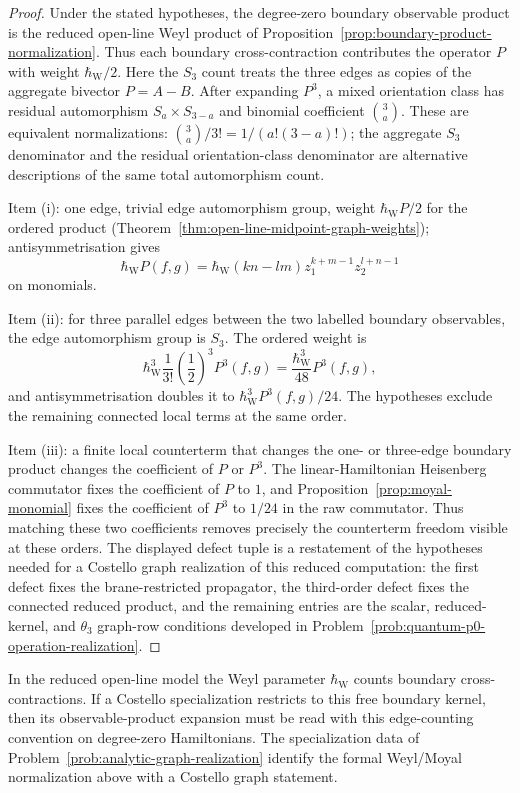 \documentclass[11pt]{memoir}
\begin{document}
\begin{proof}
  Under the stated hypotheses, the degree-zero boundary observable product is
  the reduced open-line Weyl product of
  Proposition~\ref{prop:boundary-product-normalization}. Thus each
	  boundary cross-contraction contributes the operator $P$ with weight
	  \(\hbar_{\mathrm{W}}/2\).
  Here the \(S_3\) count treats the three edges as copies of the aggregate
  bivector \(P=A-B\).  After expanding \(P^3\), a mixed orientation class
  has residual automorphism \(S_a\times S_{3-a}\) and binomial coefficient
  \(\binom{3}{a}\). These are equivalent normalizations:
  \(\binom{3}{a}/3!=1/(a!(3-a)!)\); the aggregate \(S_3\) denominator
  and the residual orientation-class denominator are alternative
  descriptions of the same total automorphism count.

	  Item (i): one edge, trivial edge automorphism group, weight \(\hbar_{\mathrm{W}} P/2\) for the
  ordered product (Theorem~\ref{thm:open-line-midpoint-graph-weights});
  antisymmetrisation gives
	  $$\hbar_{\mathrm{W}} P(f,g)=\hbar_{\mathrm{W}}(kn-lm)z_1^{k+m-1}z_2^{l+n-1}$$
  on monomials.

  Item (ii): for three parallel edges between the two labelled boundary
  observables, the edge automorphism group is $S_3$. The ordered weight is
	  $$\hbar_{\mathrm{W}}^3\frac1{3!}\left(\frac12\right)^3P^3(f,g)
	    =\frac{\hbar_{\mathrm{W}}^3}{48}P^3(f,g),$$
	  and antisymmetrisation doubles it to \(\hbar_{\mathrm{W}}^3P^3(f,g)/24\). The hypotheses
  exclude the remaining connected local terms at the same order.

  Item (iii): a finite local counterterm that changes the one- or three-edge
  boundary product changes the coefficient of $P$ or $P^3$. The
  linear-Hamiltonian Heisenberg commutator fixes the coefficient of $P$ to
  $1$, and Proposition~\ref{prop:moyal-monomial} fixes the coefficient of
  $P^3$ to $1/24$ in the raw commutator. Thus matching these two coefficients
  removes precisely the counterterm freedom visible at these orders.  The
  displayed defect tuple is a restatement of the hypotheses needed for a
  Costello graph realization of this reduced computation: the first defect fixes
  the brane-restricted propagator, the third-order defect fixes the
  connected reduced product, and the remaining entries are the scalar,
  reduced-kernel, and \(\theta_3\) graph-row conditions developed in
  Problem~\ref{prob:quantum-p0-operation-realization}.
\end{proof}

\begin{rmk}
	  In the reduced open-line model the Weyl parameter \(\hbar_{\mathrm{W}}\) counts boundary
  cross-contractions. If a Costello specialization restricts to this free
  boundary kernel, then its observable-product expansion must be read with this
  edge-counting convention on degree-zero Hamiltonians. The specialization
	  data of Problem~\ref{prob:analytic-graph-realization} identify the formal
	  Weyl/Moyal normalization above with a Costello graph statement.
\end{rmk}
\end{document}
